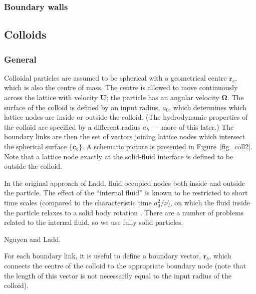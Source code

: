 \subsubsection{Boundary walls}

\subsection{Colloids}

\subsubsection{General}

Colloidal particles are assumed to be spherical with a geometrical
centre $\mathbf{r}_c$, which is also the centre of mass. The
centre is allowed to move continuously across the lattice
with velocity $\mathbf{U}$; the particle has an angular velocity
$\mathbf{\Omega}$. The surface of the colloid is defined by an
input radius, $a_0$, which determines which lattice nodes are
inside or outside the colloid. (The hydrodynamic properties of
the colloid are specified by a different radius $a_h$ --- more
of this later.) The boundary links are then the set of vectors
joining lattice nodes which intersect the spherical surface
$\{\mathbf{c}_b\}$. A schematic picture is presented in
Figure~\ref{fig_coll2}. Note that a lattice node exactly at
the solid-fluid interface is defined to be outside the colloid.

In the original approach of Ladd, fluid occupied nodes both inside
and outside the particle. The effect of the ``internal fluid'' is
known to be restricted to short time scales (compared to the
characteristic time $a_0^2/\nu$), on which the fluid inside the
particle relaxes to a solid body rotation \cite{heemels}. There
are a number of problems related to the internal fluid, so we
use fully solid particles.

Nguyen and Ladd.

For each boundary link, it is useful to define a boundary vector,
$\mathbf{r}_b$, which connects the centre of the colloid to the
appropriate boundary node (note that the length of this vector is
not necessarily equal to the input radius of the colloid).


